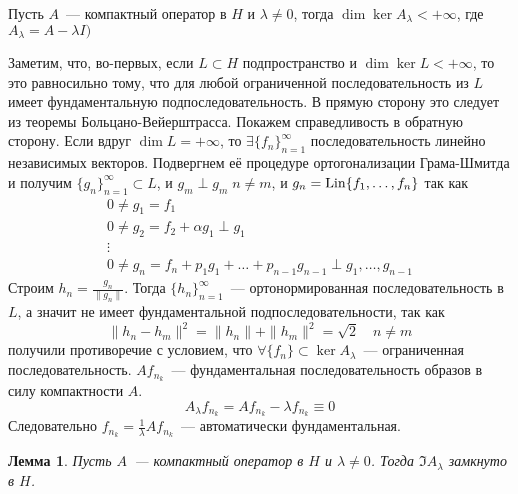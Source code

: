 \documentclass[14pt]{extarticle}
\begin{document}
\begin{Theor}
    Пусть $A$~--- компактный оператор в $H$ и $\lambda \ne 0$, тогда
    $\dim \ker A_\lambda < +\infty$, где $A_\lambda = A - \lambda I)$
\end{Theor}
\begin{Proof}
    Заметим, что, во-первых, если $L \subset H$ подпространство и $\dim \ker L
    < +\infty$, то это равносильно тому, что для любой ограниченной
    последовательность из $L$ имеет фундаментальную подпоследовательность.
    В прямую сторону это следует из теоремы Больцано-Вейерштрасса.
    Покажем справедливость в обратную сторону.
    Если вдруг $\dim L = +\infty$, то $\exists\{f_n\}_{n = 1}^\infty$
    последовательность линейно независимых векторов.
    Подвергнем её процедуре ортогонализации Грама-Шмитда и получим $\{g_n\}
    _{n = 1}^\infty \subset L$, и $g_m \perp g_m\; n \ne m$, и $g_n = \operatorname{Lin}
    \{f_1,\dots,f_n\}$ так как
    \begin{gather*}
    0 \ne g_1 = f_1\\
    0 \ne g_2 = f_2 + \alpha g_1 \perp g_1\\
    \vdots\\
    0 \ne g_n = f_n + p_1 g_1 + \dots + p_{n - 1} g_{n - 1} \perp g_1, \dots,
    g_{n - 1}
    \end{gather*}
    Строим $h_n = \frac{g_n}{\|g_n\|}$.
    Тогда $\{h_n\}_{n = 1}^\infty$~--- ортонормированная последовательность в
    $L$, а значит не имеет фундаментальной подпоследовательности, так как
    $$
    \|h_n - h_m\|^2 = \|h_n\| + \|h_m\|^2 = \sqrt{2} \quad n \ne m
    $$
    получили противоречие с условием, что $\forall \{f_n\} \subset \ker A_
    \lambda$~--- ограниченная последовательность.
    $A f_{n_k}$~--- фундаментальная последовательность образов в силу
    компактности $A$.
    $$
    A_\lambda f_{n_k} = A f_{n_k} - \lambda f_{n_k} \equiv 0
    $$
    Следовательно $f_{n_k} = \frac{1}{\lambda}A f_{n_k}$~--- автоматически
    фундаментальная.
\end{Proof}
\newtheorem{Lemm}{Лемма}
\begin{Lemm}
    Пусть $A$~--- компактный оператор в $H$ и $\lambda \ne 0$.
    Тогда $\Im A_\lambda$ замкнуто в $H$.
\end{Lemm}
\end{document}
